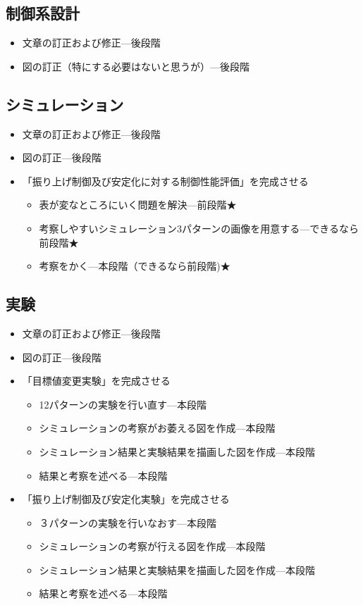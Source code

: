 	\subsection{制御系設計}
		\begin{itemize}
		  \item 文章の訂正および修正---後段階
		  \item 図の訂正（特にする必要はないと思うが）---後段階
		\end{itemize}
	\subsection{シミュレーション}
		\begin{itemize}
		  \item 文章の訂正および修正---後段階
		  \item 図の訂正---後段階
		  \item 「振り上げ制御及び安定化に対する制御性能評価」を完成させる
		  \begin{itemize}
		    \item 表が変なところにいく問題を解決---前段階★
		    \item 考察しやすいシミュレーション3パターンの画像を用意する---できるなら前段階★
		   	\item 考察をかく---本段階（できるなら前段階)★
		  \end{itemize}
		\end{itemize}
	\subsection{実験}
		\begin{itemize}
		  \item 文章の訂正および修正---後段階
		  \item 図の訂正---後段階
		  \item 「目標値変更実験」を完成させる
		   \begin{itemize}
		     \item 12パターンの実験を行い直す---本段階
		     \item シミュレーションの考察がお萎える図を作成---本段階
		     \item シミュレーション結果と実験結果を描画した図を作成---本段階
		     \item 結果と考察を述べる---本段階
		  \end{itemize}
		  \item 「振り上げ制御及び安定化実験」を完成させる
		  	\begin{itemize}
		  	  \item ３パターンの実験を行いなおす---本段階
		  	  \item シミュレーションの考察が行える図を作成---本段階
		  	  \item シミュレーション結果と実験結果を描画した図を作成---本段階
		  	  \item 結果と考察を述べる---本段階
		  	\end{itemize}
		\end{itemize}
